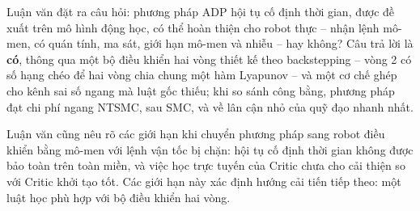 \documentclass[12pt,a4paper]{article}
\begin{document}
Luận văn đặt ra câu hỏi: phương pháp ADP hội tụ cố định thời gian, được đề xuất trên mô hình động học, có thể hoàn thiện cho robot thực -- nhận lệnh mô-men, có quán tính, ma sát, giới hạn mô-men và nhiễu -- hay không? Câu trả lời là \textbf{có}, thông qua một bộ điều khiển hai vòng thiết kế theo backstepping -- vòng 2 có số hạng chéo để hai vòng chia chung một hàm Lyapunov -- và một cơ chế ghép cho kênh sai số ngang mà luật gốc thiếu; khi so sánh công bằng, phương pháp đạt chi phí ngang NTSMC, sau SMC, và về lân cận nhỏ của quỹ đạo nhanh nhất.

Luận văn cũng nêu rõ các giới hạn khi chuyển phương pháp sang robot điều khiển bằng mô-men với lệnh vận tốc bị chặn: hội tụ cố định thời gian không được bảo toàn trên toàn miền, và việc học trực tuyến của Critic chưa cho cải thiện so với Critic khởi tạo tốt. Các giới hạn này xác định hướng cải tiến tiếp theo: một luật học phù hợp với bộ điều khiển hai vòng.
\end{document}

